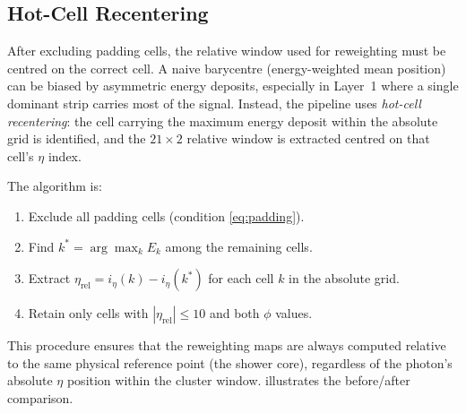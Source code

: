 \documentclass[11pt,a4paper]{article}
\begin{document}
\subsection{Hot-Cell Recentering}
\label{sec:method:recentering}

After excluding padding cells, the relative window used for
reweighting must be centred on the correct cell.  A naive barycentre
(energy-weighted mean position) can be biased by asymmetric energy
deposits, especially in Layer~1 where a single dominant strip carries
most of the signal.  Instead, the pipeline uses \emph{hot-cell
recentering}: the cell carrying the maximum energy deposit within the
absolute grid is identified, and the $21 \times 2$ relative window is
extracted centred on that cell's $\eta$ index.

The algorithm is:
\begin{enumerate}[label=\arabic*.]
  \item Exclude all padding cells (condition \cref{eq:padding}).
  \item Find $k^* = \arg\max_k E_k$ among the remaining cells.
  \item Extract $\eta_\mathrm{rel} = i_\eta(k) - i_\eta(k^*)$ for
        each cell $k$ in the absolute grid.
  \item Retain only cells with $|\eta_\mathrm{rel}| \le 10$ and both
        $\phi$ values.
\end{enumerate}

This procedure ensures that the reweighting maps are always
computed relative to the same physical reference point (the shower
core), regardless of the photon's absolute $\eta$ position within
the cluster window.   illustrates the
before/after comparison.
\end{document}
